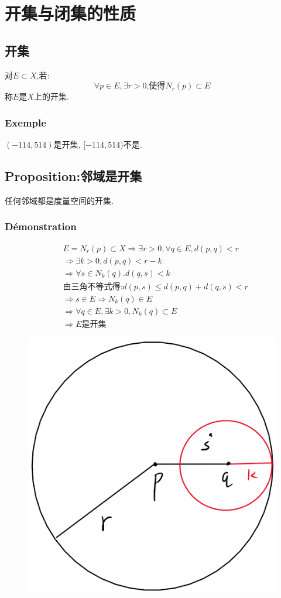 \documentclass[12pt, a4paper, oneside]{ctexbook}
\begin{document}
\section{开集与闭集的性质}
  \subsection{开集}
  对$E\subset X$,若:
  $$
    \forall p\in E, \exists r>0\text{,使得}N_r(p)\subset E
  $$称$E$是$X$上的开集.
  \subsubsection{Exemple}
  $(-114,514)$是开集, $[-114,514)$不是.

  \subsection{Proposition:邻域是开集}
  任何邻域都是度量空间的开集.
  \subsubsection{Démonstration}
  $$
  \begin{aligned}&
  E=N_r(p)\subset X\Rightarrow \exists r>0, \forall q\in E,d(p,q)<r\\ &
  \Rightarrow \exists k>0,d(p,q)<r-k\\ &
  \Rightarrow \forall s\in N_k(q).d(q,s)<k\\ &
  \text{由三角不等式得:}d(p,s)\leq d(p,q)+d(q,s)<r\\ &
  \Rightarrow s\in E\Rightarrow N_k(q)\in E\\ &
  \Rightarrow \forall q\in E, \exists k>0 , N_k(q)\subset E\\ &
  \Rightarrow E\text{是开集}
  \end{aligned}
  $$
  \begin{figure}[H]%
    \centering
    \includegraphics[scale=0.5]{linyushikaiji.png}
  \end{figure}
\end{document}
